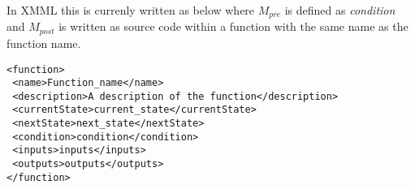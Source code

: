 In XMML this is currenly written as below where $M_{pre}$ is defined as
\textit{condition} and $M_{post}$ is written as source code within a function
with the same name as the function name.

\begin{mylisting}
\begin{verbatim}
<function>
 <name>Function_name</name>
 <description>A description of the function</description>
 <currentState>current_state</currentState>
 <nextState>next_state</nextState>
 <condition>condition</condition>
 <inputs>inputs</inputs>
 <outputs>outputs</outputs>
</function>
\end{verbatim}
\end{mylisting}

